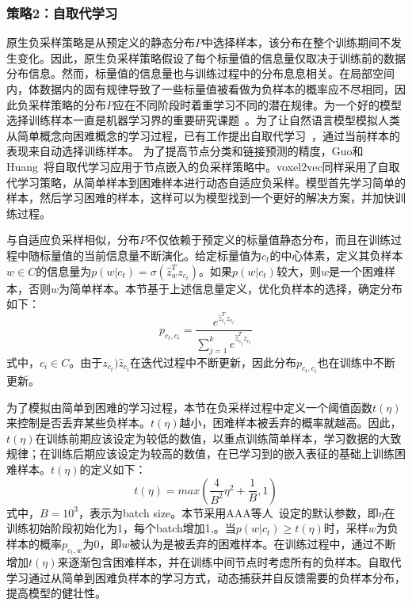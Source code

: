 \subsubsection{策略2：自取代学习}

原生负采样策略是从预定义的静态分布$P$中选择样本，该分布在整个训练期间不发生变化。因此，原生负采样策略假设了每个标量值的信息量仅取决于训练前的数据分布信息。然而，标量值的信息量也与训练过程中的分布息息相关。在局部空间内，体数据内的固有规律导致了一些标量值被看做为负样本的概率应不尽相同，因此负采样策略的分布$P$应在不同阶段时着重学习不同的潜在规律。为一个好的模型选择训练样本一直是机器学习界的重要研究课题~\cite{BUDA:2018:ASS}。为了让自然语言模型模拟人类从简单概念向困难概念的学习过程，已有工作提出自取代学习~\cite{KUMAR:2010:SLF}，通过当前样本的表现来自动选择训练样本。
为了提高节点分类和链接预测的精度，Guo和Huang~\cite{GAO:2018:SNE}将自取代学习应用于节点嵌入的负采样策略中。voxel2vec同样采用了自取代学习策略，从简单样本到困难样本进行动态自适应负采样。模型首先学习简单的样本，然后学习困难的样本，这样可以为模型找到一个更好的解决方案，并加快训练过程。

与自适应负采样相似，分布$P$不仅依赖于预定义的标量值静态分布，而且在训练过程中随标量值的当前信息量不断演化。给定标量值为$c_t$的中心体素，定义其负样本$w \in C$的信息量为$p(w|c_t)=\sigma(\hat{z}_{w}^{T}z_{c_t})$。如果$p(w|c_t)$较大，则$w$是一个困难样本，否则$w$为简单样本。本节基于上述信息量定义，优化负样本的选择，确定分布如下：
\begin{equation}
    p_{c_t,c_i} = \frac{
        e^{
            \hat{z}_{c_i}^{T}z_{c_t}
        }
    }
    {\sum_{j=1}^{k}e^{\hat{z}_{c_j}^{T}z_{c_t}}}
\end{equation}
式中，$c_i \in C$。由于$z_{c_t})$$\hat{z}_{c_i}$在迭代过程中不断更新，因此分布$p_{c_t,c_i}$也在训练中不断更新。


为了模拟由简单到困难的学习过程，本节在负采样过程中定义一个阈值函数$t(\eta )$来控制是否丢弃某些负样本。$t(\eta )$越小，困难样本被丢弃的概率就越高。因此，$t(\eta )$在训练前期应该设定为较低的数值，以重点训练简单样本，学习数据的大致规律；在训练后期应该设定为较高的数值，在已学习到的嵌入表征的基础上训练困难样本。$t(\eta )$的定义如下：
\begin{equation}
    t(\eta ) = max(\frac{4}{B^2}\eta^2+\frac{1}{B}, 1)
\end{equation}
式中，$B=10^3$，表示为batch size。本节采用AAA等人~\cite{}设定的默认参数，即$\eta $在训练初始阶段初始化为1，每个batch增加1,。当$p(w|c_t) \geqslant t(\eta )$时，采样$w$为负样本的概率$p_{c_t,w}$为0，即$w$被认为是被丢弃的困难样本。在训练过程中，通过不断增加$t(\eta)$来逐渐包含困难样本，并在训练中间节点时考虑所有的负样本。自取代学习通过从简单到困难负样本的学习方式，动态捕获并自反馈需要的负样本分布，提高模型的健壮性。


